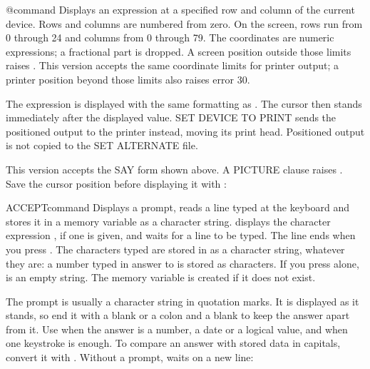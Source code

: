 \begin{XbaseEntry}{@}{command}
Displays an expression at a specified row and column of the current device.
\Syntax
{}
\Usage
Rows and columns are numbered from zero.  On the screen, rows run from 0
through 24 and columns from 0 through 79.  The coordinates are numeric
expressions; a fractional part is dropped.  A screen position outside those
limits raises .
This version accepts the same coordinate limits for printer output; a
printer position beyond those limits also raises error 30.

The expression is displayed with the same formatting as .  The cursor
then stands immediately after the displayed value.  SET DEVICE TO PRINT
sends the positioned output to the printer instead, moving its print head.
Positioned output is not copied to the SET ALTERNATE file.

This version accepts the SAY form shown above.  A PICTURE clause raises
.
\Examples
Save the cursor position before displaying it with :
\end{XbaseEntry}

\begin{XbaseEntry}{ACCEPT}{command}
Displays a prompt, reads a line typed at the keyboard and stores it in a
memory variable as a character string.
\Syntax
{}
\Usage
{} displays the character expression , if one is given, and
waits for a line to be typed.  The line ends when you press .  The
characters typed are stored in  as a character string, whatever
they are: a number typed in answer to  is stored as characters.  If
you press  alone,  is an empty string.  The memory
variable is created if it does not exist.

The prompt is usually a character string in quotation marks.  It is displayed
as it stands, so end it with a blank or a colon and a blank to keep the answer
apart from it.
\Tips
Use  when the answer is a number, a date or a logical value, and
 when one keystroke is enough.  To compare an answer with stored
data in capitals, convert it with .
\Examples
{}
Without a prompt,  waits on a new line:
\end{XbaseEntry}

